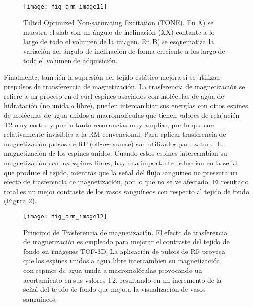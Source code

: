 \begin{figure}[htbp]
\begin{figg}
 \texttt{[image: fig\_arm\_image11]}
 \caption{
Tilted Optimized Non-saturating Excitation (TONE). En A) se muestra el slab con un ángulo de inclinación (XX) contante a lo largo de todo el volumen de la imagen. En B) se esquematiza la variación del ángulo de inclinación de forma creciente a los largo de todo el volumen de adquisición. 
 }
 \label{fig:arm_image11}
\end{figg}
\end{figure}



Finalmente, también la supresión del tejido estático mejora si se utilizan prepulsos de transferencia de magnetización. La trasferencia de magnetización se refiere a un proceso en el cual espines asociados con moléculas de agua de hidratación (no unida o libre), pueden intercambiar sus energías con otros espines de moléculas de agua unidos a macromoléculas que tienen valores de relajación T2 muy cortos y por lo tanto resonancias muy amplias, por lo que son relativamente invisibles a la RM convencional. Para aplicar trasferencia de magnetización pulsos de RF (off-resonance) son utilizados para saturar la magnetización de los espines unidos. Cuando estos espines intercambian su magnetización con los espines libres, hay una importante reducción en la señal que produce el tejido, mientras que la señal del flujo sanguíneo no presenta un efecto de trasferencia de magnetización, por lo que no se ve afectado. El resultado total es un mejor contraste de los vasos sanguíneos con respecto al tejido de fondo (Figura \ref{fig:arm_image12}).



\begin{figure}[htbp]
\begin{figg}
 \texttt{[image: fig\_arm\_image12]}
 \caption{
Principio de Trasferencia de magnetización. El efecto de trasferencia de magnetización es empleado para mejorar el contraste del tejido de fondo en imágenes TOF-3D. La aplicación de pulsos de RF provoca que los espines unidos a agua libre intercambien su magnetización con espines de agua unida a macromoléculas provocando un acortamiento en sus valores T2, resultando en un incremento de la señal del tejido de fondo que mejora la visualización de vasos sanguíneos.
 }
 \label{fig:arm_image12}
\end{figg}
\end{figure}




